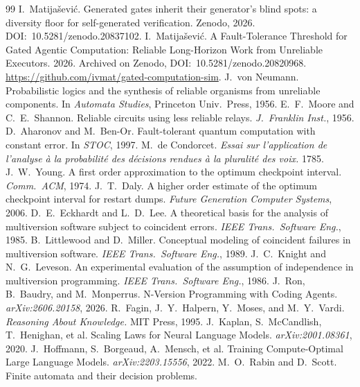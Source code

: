 \documentclass[11pt]{article}
\theoremstyle{definition}
\theoremstyle{remark}
\begin{document}
\begin{thebibliography}{99}
\small
{} I.~Matija\v{s}evi\'c. Generated gates inherit their generator's blind
spots: a diversity floor for self-generated verification. Zenodo, 2026.
DOI:~10.5281/zenodo.20837102.
 I.~Matija\v{s}evi\'c. A Fault-Tolerance Threshold for Gated Agentic
Computation: Reliable Long-Horizon Work from Unreliable Executors. 2026.
Archived on Zenodo, DOI:~10.5281/zenodo.20820968.
\url{https://github.com/ivmat/gated-computation-sim}.
 J.~von Neumann. Probabilistic logics and the synthesis of reliable
organisms from unreliable components. In \emph{Automata Studies}, Princeton Univ.\ Press, 1956.
 E.~F.~Moore and C.~E.~Shannon. Reliable circuits using less reliable relays.
\emph{J.~Franklin Inst.}, 1956.
 D.~Aharonov and M.~Ben-Or. Fault-tolerant quantum computation with constant
error. In \emph{STOC}, 1997.
 M.~de Condorcet. \emph{Essai sur l'application de l'analyse \`a la
probabilit\'e des d\'ecisions rendues \`a la pluralit\'e des voix.} 1785.
 J.~W.~Young. A first order approximation to the optimum checkpoint interval.
\emph{Comm.\ ACM}, 1974.
 J.~T.~Daly. A higher order estimate of the optimum checkpoint interval for
restart dumps. \emph{Future Generation Computer Systems}, 2006.
 D.~E.~Eckhardt and L.~D.~Lee. A theoretical basis for the analysis of
multiversion software subject to coincident errors. \emph{IEEE Trans.\ Software Eng.}, 1985.
 B.~Littlewood and D.~Miller. Conceptual modeling of coincident failures
in multiversion software. \emph{IEEE Trans.\ Software Eng.}, 1989.
 J.~C.~Knight and N.~G.~Leveson. An experimental evaluation of the assumption
of independence in multiversion programming. \emph{IEEE Trans.\ Software Eng.}, 1986.
 J.~Ron, B.~Baudry, and M.~Monperrus. N-Version Programming with Coding Agents.
\emph{arXiv:2606.20158}, 2026.
 R.~Fagin, J.~Y.~Halpern, Y.~Moses, and M.~Y.~Vardi. \emph{Reasoning About
Knowledge.} MIT Press, 1995.
 J.~Kaplan, S.~McCandlish, T.~Henighan, et al. Scaling Laws for Neural Language
Models. \emph{arXiv:2001.08361}, 2020.
 J.~Hoffmann, S.~Borgeaud, A.~Mensch, et al. Training Compute-Optimal Large
Language Models. \emph{arXiv:2203.15556}, 2022.
 M.~O.~Rabin and D.~Scott. Finite automata and their decision problems.

\end{thebibliography}
\end{document}
